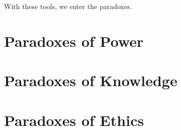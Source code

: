 \documentclass[11pt,openany]{book}
\theoremstyle{definition}
\theoremstyle{plain}
\theoremstyle{remark}
\begin{document}
With these tools, we enter the paradoxes.

\part{Paradoxes of Power}



\part{Paradoxes of Knowledge}



\part{Paradoxes of Ethics}


\end{document}
